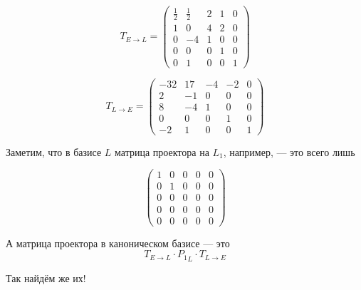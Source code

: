 \documentclass[12pt, a4paper]{article}
\begin{document}
    \begin{equation}
        T_{E \to L} = \left(\begin{matrix}
            \frac{1}{2} & \frac{1}{2} & 2 & 1 & 0 \\
            1 & 0 & 4 & 2 & 0 \\
            0 & -4 & 1 & 0 & 0 \\
            0 & 0 & 0 & 1 & 0 \\
            0 & 1 & 0 & 0 & 1
        \end{matrix}\right)
    \end{equation}

    \begin{equation}
        T_{L \to E} = \left(\begin{matrix}
            -32 & 17 & -4 & -2 & 0 \\
            2 & -1 & 0 & 0 & 0 \\
            8 & -4 & 1 & 0 & 0 \\
            0 & 0 & 0 & 1 & 0 \\
            -2 & 1 & 0 & 0 & 1
        \end{matrix}\right)
    \end{equation}

    Заметим, что в базисе $L$ матрица проектора на $L_1$, например, — это всего лишь

    \begin{equation}
        \left(\begin{matrix}
            1 & 0 & 0 & 0 & 0 \\
            0 & 1 & 0 & 0 & 0 \\
            0 & 0 & 0 & 0 & 0 \\
            0 & 0 & 0 & 0 & 0 \\
            0 & 0 & 0 & 0 & 0
        \end{matrix}\right)
    \end{equation}

    А матрица проектора в каноническом базисе — это
    \begin{equation}
        T_{E \to L} \cdot {P_1}_L \cdot T_{L \to E}
    \end{equation}

    Так найдём же их!
\end{document}
